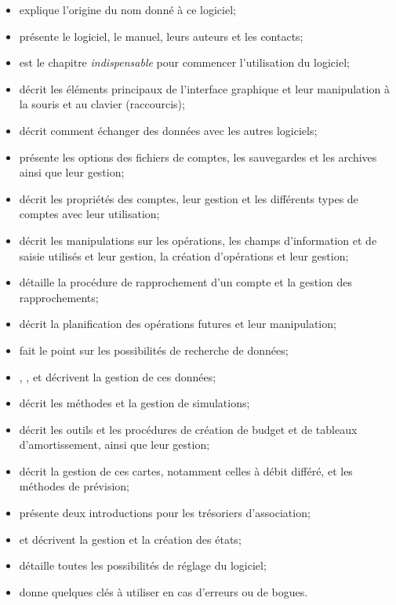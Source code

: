 \begin{itemize}
	\item {} explique l'origine du nom donné à ce logiciel;
	\item {} présente le logiciel, le manuel, leurs auteurs et les contacts;
	\item {} est le chapitre \emph{indispensable} pour commencer l'utilisation du logiciel;
	\item {} décrit les éléments principaux de l'interface graphique et leur manipulation à la souris et au clavier (raccourcis);
	\item {} décrit comment échanger des données avec les autres logiciels;
	\item {} présente les options des fichiers de comptes, les sauvegardes et les archives ainsi que leur gestion;
	\item {} décrit les propriétés des comptes, leur gestion et les différents types de comptes avec leur utilisation;
	\item {} décrit les manipulations sur les opérations, les champs d'information et de saisie utilisés et leur gestion, la création d'opérations et leur gestion;
	\item {} détaille la procédure de rapprochement d'un compte et la gestion des rapprochements;		
	\item {} décrit la planification des opérations futures et leur manipulation;
	\item {} fait le point sur les possibilités de recherche de données;
	\item {}, ,  et  décrivent la gestion de ces données;
	\item {} décrit les méthodes et la gestion de simulations;
	\item {} décrit les outils et les procédures de création de budget et de tableaux d'amortissement, ainsi que leur gestion;
	\item {} décrit la gestion de ces cartes, notamment celles à débit différé, et les méthodes de prévision;	
	\item {} présente deux introductions pour les trésoriers d'association;
	\item {} et  décrivent la gestion et la création des états;
	\item {} détaille toutes les possibilités de réglage du logiciel;
	\item {} donne quelques clés à utiliser en cas d'erreurs ou de bogues.
\end{itemize}


